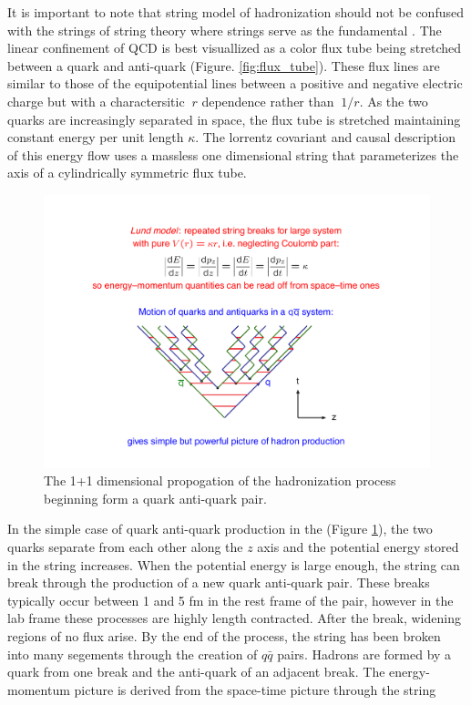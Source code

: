 It is important to note that string model of hadronization should not be confused with the strings of string theory where strings serve as the fundamental .  The linear
 confinement of QCD is best visuallized as a color flux tube being stretched between a quark and anti-quark (Figure. \ref{fig:flux_tube}). These flux lines are similar
to those of the equipotential lines between a positive and negative electric charge but with a charactersitic $~r$ dependence rather than $~1/r$. 
As the two quarks are increasingly separated in space, the flux tube is stretched maintaining constant energy per unit length $\kappa$. The lorrentz covariant and
causal description of this energy flow uses a massless one dimensional string that parameterizes the axis of a cylindrically symmetric flux tube. 
\begin{figure}
\begin{center}
\includegraphics[width=.65\textwidth]{pics/lund_model}
\end{center}
\caption{The 1+1 dimensional propogation of the hadronization process beginning form a quark anti-quark pair.  }
\label{fig:lund}
\end{figure}
In the simple case of quark anti-quark production in the (Figure \ref{fig:lund}), the two quarks separate 
from each other along the $z$ axis and the potential energy stored in the 
string increases. When the potential energy is large enough, the string can break through the production
 of a new quark anti-quark pair. These breaks typically occur between 1 and 5 fm in the rest
 frame of the pair, however in the lab frame these processes are highly length contracted. 
After the break, widening regions of no flux arise. By the end of the process, the string has been broken into many
segements through the creation of $q\bar{q}$ pairs. Hadrons are formed by a quark from one break and the anti-quark
of an adjacent break. The energy-momentum picture is derived from the space-time picture through the string

